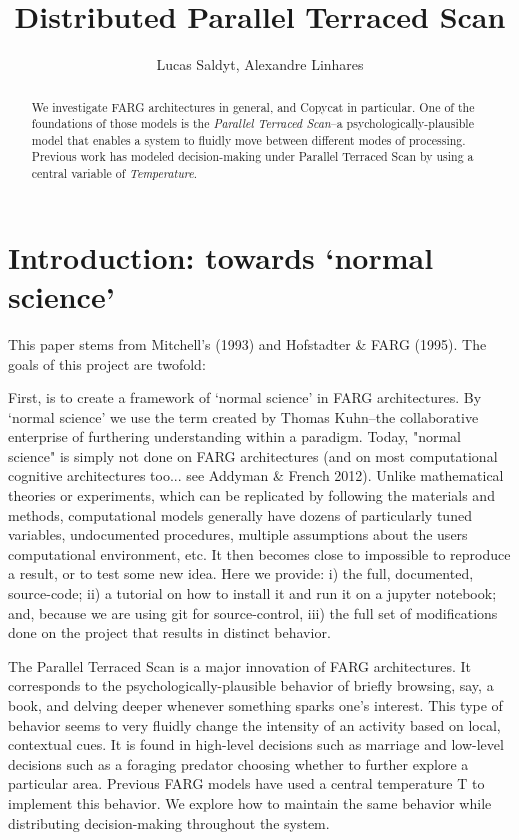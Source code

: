 \documentclass[a4paper]{article}
\title{Distributed Parallel Terraced Scan}
\author{Lucas Saldyt, Alexandre Linhares}
\begin{document}
\maketitle

\begin{abstract}
We investigate FARG architectures in general, and Copycat in particular.  One of the foundations of those models is the \emph{Parallel Terraced Scan}--a psychologically-plausible model that enables a system to fluidly move between different modes of processing.  Previous work has modeled decision-making under Parallel Terraced Scan by using a central variable of \emph{Temperature}. 

\end{abstract}

\section{Introduction: towards `normal science'}

This paper stems from Mitchell's (1993) and Hofstadter \& FARG (1995). The goals of this project are twofold:

 	First, is to create a framework of  `normal science' in FARG architectures. By `normal science' we use the term created by Thomas Kuhn--the collaborative enterprise of furthering understanding within a paradigm. Today, "normal science" is simply not done on FARG architectures (and on most computational cognitive architectures too... see Addyman \& French 2012). Unlike mathematical theories or experiments, which can be replicated by following the materials and methods, computational models generally have dozens of particularly tuned variables, undocumented procedures, multiple assumptions about the users computational environment, etc. It then becomes close to impossible to reproduce a result, or to test some new idea. Here we provide: i) the full, documented, source-code; ii) a tutorial on how to install it and run it on a jupyter notebook; and, because we are using git for source-control, iii) the full set of modifications done on the project that results in distinct behavior.

The Parallel Terraced Scan is a major innovation of FARG architectures. It corresponds to the psychologically-plausible behavior of briefly browsing, say, a book, and delving deeper whenever something sparks one's interest. This type of behavior seems to very fluidly change the intensity of an activity based on local, contextual cues. It is found in high-level decisions such as marriage and low-level decisions such as a foraging predator choosing whether to further explore a particular area. Previous FARG models have used a central temperature T to implement this behavior. We explore how to maintain the same behavior while distributing decision-making throughout the system.
\end{document}
